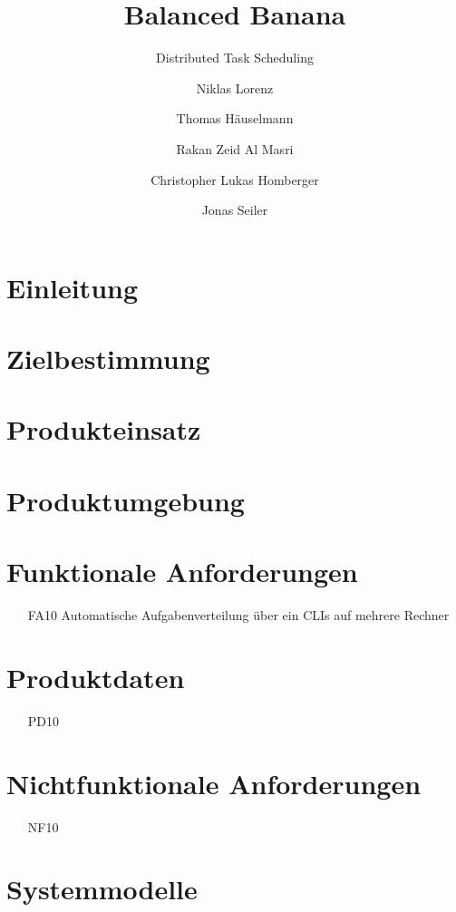 \documentclass[parskip=full]{scrartcl}
\title{Balanced Banana}
\subtitle{Distributed Task Scheduling}
\author{Niklas Lorenz \and Thomas Häuselmann \and Rakan Zeid Al Masri \and Christopher Lukas Homberger \and Jonas Seiler}
\begin{document}
\maketitle

\section{Einleitung}

\section{Zielbestimmung}

\section{Produkteinsatz}

\section{Produktumgebung}

\section{Funktionale Anforderungen}
\begin{itemize}[nosep]
\item[FA10] Automatische Aufgabenverteilung über ein \glspl{CLI} auf mehrere Rechner
\end{itemize}

\section{Produktdaten}
\begin{itemize}[nosep]
\item[PD10]
\end{itemize}

\section{Nichtfunktionale Anforderungen}
\begin{itemize}[nosep]
\item[NF10]
\end{itemize}

\section{Systemmodelle}
\end{document}
